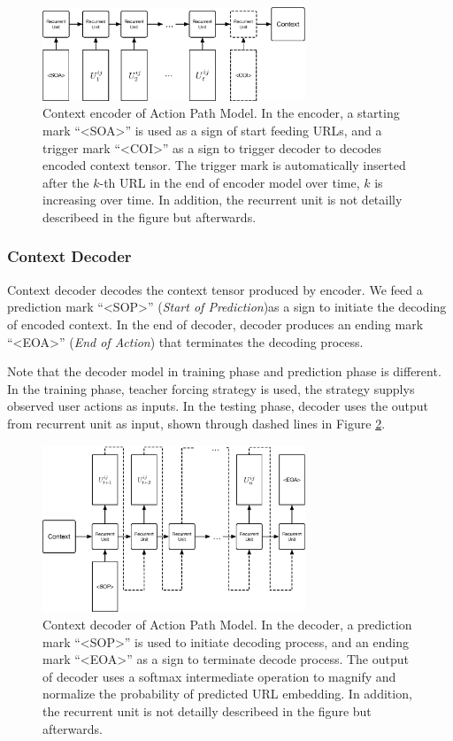 \begin{figure}[H]
    \centering
    \includegraphics[width=0.7\textwidth]{figures/encoder}
    \caption{Context encoder of Action Path Model. In the encoder, 
    a starting mark ``<SOA>'' is used as a sign of start feeding URLs, 
    and a trigger mark ``<COI>'' as
    a sign to trigger decoder to decodes encoded context tensor.
    The trigger mark is automatically inserted after the $k$-th URL in the end
    of encoder model over time, $k$ is increasing over time.
    In addition, the recurrent unit is not detailly describeed in the figure but afterwards.}
    \label{fig:encoder}
\end{figure}

\subsubsection{Context Decoder}

Context decoder decodes the context tensor produced by encoder. We feed a prediction mark
``<SOP>'' (\emph{Start of Prediction})as a sign to initiate the decoding of encoded context.
In the end of decoder, decoder produces an ending mark ``<EOA>'' (\emph{End of Action}) that
terminates the decoding process.

Note that the decoder model in training phase and prediction phase is different.
In the training phase, teacher forcing strategy \cite{williams1989learning} is used, 
the strategy supplys observed user actions as inputs.
In the testing phase, decoder uses the output from recurrent unit as input, shown through 
dashed lines in Figure \ref{fig:decoder}.

\begin{figure}[H]
    \centering
    \includegraphics[width=0.7\textwidth]{figures/decoder}
    \caption{Context decoder of Action Path Model. In the decoder, 
    a prediction mark ``<SOP>'' is used to initiate decoding process, 
    and an ending mark ``<EOA>'' as a sign to terminate decode process.
    The output of decoder uses a softmax intermediate operation to magnify and normalize
    the probability of predicted URL embedding.
    In addition, the recurrent unit is not detailly describeed in the figure but afterwards.}
    \label{fig:decoder}
\end{figure}

